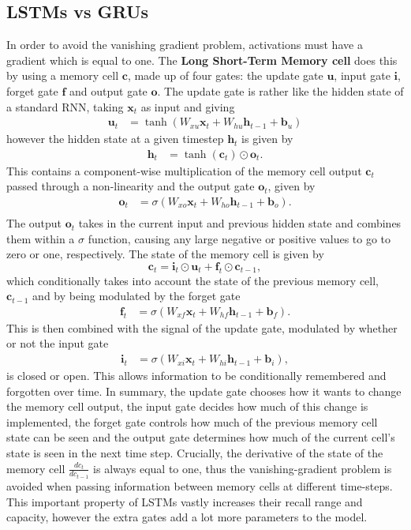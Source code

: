 \documentclass[]{article}
\begin{document}
\subsection{LSTMs vs GRUs}
In order to avoid the vanishing gradient problem, activations must have a gradient which is equal to one. The \textbf{Long Short-Term Memory cell} does this by using a memory cell $\textbf{c}$, made up of four gates: the update gate $\textbf{u}$, input gate $\textbf{i}$, forget gate $\textbf{f}$ and output gate $\textbf{o}$. The update gate is rather like the hidden state of a standard RNN, taking $\textbf{x}_t$ as input and giving
\begin{align}
\textbf{u}_t&=\tanh(W_{xu}\textbf{x}_t+W_{hu}\textbf{h}_{t-1}+\textbf{b}_u)
\end{align}
however the hidden state at a given timestep $\textbf{h}_{t}$ is given by
\begin{align}
\label{eq:hiddenLSTM}
\textbf{h}_{t}&= \tanh(\textbf{c}_t) \odot \textbf{o}_t.
\end{align}
This contains a component-wise multiplication of the memory cell output $\textbf{c}_t$ passed through a non-linearity and the output gate $\textbf{o}_t$, given by
\begin{align}
\textbf{o}_{t}&=\sigma(W_{xo}\textbf{x}_t+W_{ho}\textbf{h}_{t-1}+\textbf{b}_o).\\
\end{align}
The output $\textbf{o}_t$ takes in the current input and previous hidden state and combines them within a $\sigma$ function, causing any large negative or positive values to go to zero or one, respectively. The state of the memory cell is given by
\begin{equation}
	\textbf{c}_{t}=\textbf{i}_t\odot \textbf{u}_t + \textbf{f}_t\odot\textbf{c}_{t-1},
\end{equation}
which conditionally takes into account the state of the previous memory cell, $\textbf{c}_{t-1}$ and by being modulated by the forget gate
\begin{align}
\textbf{f}_{t}&=\sigma(W_{xf}\textbf{x}_t+W_{hf}\textbf{h}_{t-1}+\textbf{b}_f).
\end{align}
This is then combined with the signal of the update gate, modulated by whether or not the input gate
\begin{align}
\textbf{i}_{t}&=\sigma(W_{xi}\textbf{x}_t+W_{hi}\textbf{h}_{t-1}+\textbf{b}_i),
\end{align}
is closed or open. This allows information to be conditionally remembered and forgotten over time. In summary, the update gate chooses how it wants to change the memory cell output, the input gate decides how much of this change is implemented, the forget gate controls how much of the previous memory cell state can be seen and the output gate determines how much of the current cell's state is seen in the next time step.  Crucially, the derivative of the state of the memory cell $\frac{dc_t}{dc_{t-1}}$ is always equal to one, thus the vanishing-gradient problem is avoided when passing information between memory cells at different time-steps. This important property of LSTMs vastly increases their recall range and capacity, however the extra gates add a lot more parameters to the model. 
\end{document}
